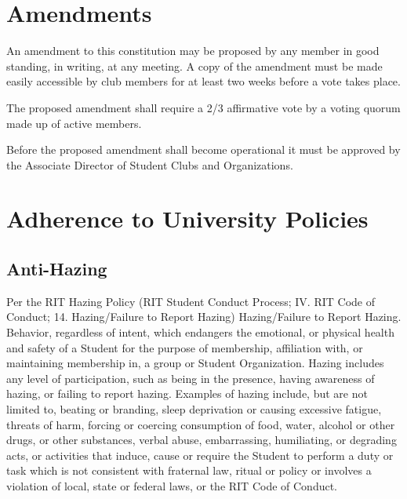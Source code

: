 \documentclass[a4paper]{article}
\begin{document}
\section{Amendments}
\begin{subroutines}
\item An amendment to this constitution may be proposed by any member in good standing, in writing, at any meeting. A copy of the amendment must be made easily accessible by club members for at least two weeks before a vote takes place. 
\item The proposed amendment shall require a 2/3 affirmative vote by a voting quorum made up of active members.
\item Before the proposed amendment shall become operational it must be approved by the Associate Director of Student Clubs and Organizations.
\end{subroutines}

\section{Adherence to University Policies}
\subsection{Anti-Hazing}
\begin{subroutines}
    \item Per the RIT Hazing Policy (RIT Student Conduct Process; IV. RIT Code of Conduct; 14. Hazing/Failure to Report
Hazing)
Hazing/Failure to Report Hazing. Behavior, regardless of intent, which endangers the emotional, or physical
health and safety of a Student for the purpose of membership, affiliation with, or maintaining membership in,
a group or Student Organization. Hazing includes any level of participation, such as being in the presence,
having awareness of hazing, or failing to report hazing. Examples of hazing include, but are not limited to,
beating or branding, sleep deprivation or causing excessive fatigue, threats of harm, forcing or coercing
consumption of food, water, alcohol or other drugs, or other substances, verbal abuse, embarrassing,
humiliating, or degrading acts, or activities that induce, cause or require the Student to perform a duty or task
which is not consistent with fraternal law, ritual or policy or involves a violation of local, state or federal laws,
or the RIT Code of Conduct.
\end{subroutines}
\end{document}
